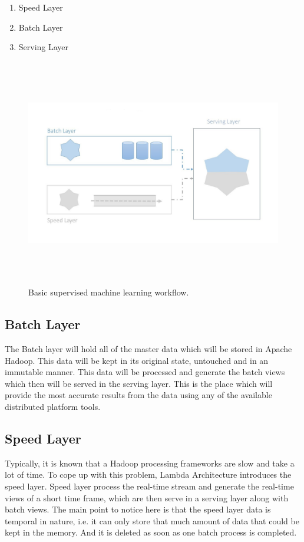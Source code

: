 \begin{enumerate}
	\item Speed Layer
	\item Batch Layer
	\item Serving Layer
	
\end{enumerate}


\begin{figure}[htpb]
	\centering
	\includegraphics[width=12cm,height=10cm,keepaspectratio=true]{images/lambda_arc}
	\caption{
		Basic supervised machine learning workflow.
	}
	\label{fig:lambda_arc}
\end{figure}



\subsection{Batch Layer}
The Batch layer will hold all of the master data which will be stored in Apache Hadoop. This data will be kept in its original state, untouched and in an immutable manner. This data will be processed and generate the batch views which then will be served in the serving layer. This is the place which will provide the most accurate results from the data using any of the available distributed platform tools.

\subsection{Speed Layer}
Typically, it is known that a Hadoop processing frameworks are slow and take a lot of time. To cope up with this problem, Lambda Architecture introduces the speed layer. Speed layer process the real-time stream and generate the real-time views of a short time frame, which are then serve in a serving layer along with batch views. The main point to notice here is that the speed layer data is temporal in nature, i.e. it can only store that much amount of data that could be kept in the memory. And it is deleted as soon as one batch process is completed.


